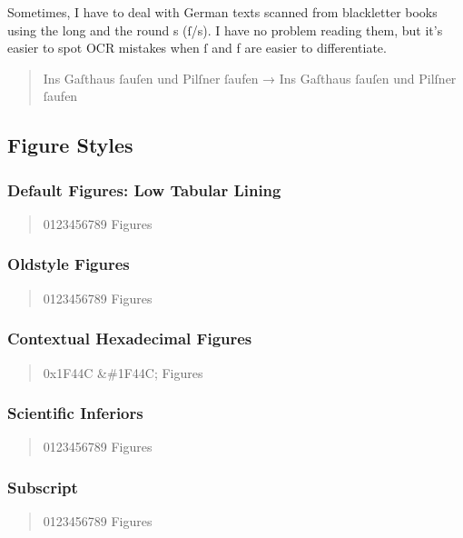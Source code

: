 Sometimes, I have to deal with German texts scanned from blackletter books using the long and the round s (ſ/s). I have no problem reading them, but it’s easier to spot OCR mistakes when ſ and f are easier to differentiate.

\begin{quote}
Ins Gaſthaus ſauſen und Pilſner ſaufen → { Ins Gaſthaus ſauſen und Pilſner ſaufen}
\end{quote}

\subsection{Figure Styles}

\subsubsection{Default Figures: Low Tabular Lining}

\begin{quote}
0123456789 Figures
\end{quote}

\subsubsection{Oldstyle Figures}
\begin{quote}
{ 0123456789 Figures}
\end{quote}

\subsubsection{Contextual Hexadecimal Figures}
\begin{quote}
{ 0x1F44C \&\#1F44C; Figures}
\end{quote}

\subsubsection{Scientific Inferiors}
\begin{quote}
{ 0123456789 Figures}
\end{quote}

\subsubsection{Subscript}
\begin{quote}
{ 0123456789 Figures}
\end{quote}

